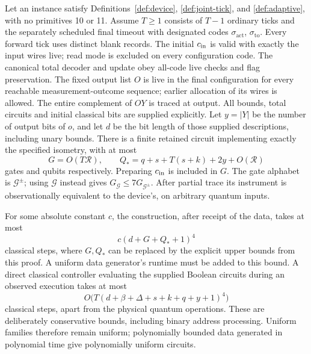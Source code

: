 \begin{theorem}
\label{eqv:forward}
Let an instance satisfy Definitions~\ref{def:device},
\ref{def:joint-tick}, and \ref{def:adaptive}, with no primitives 10 or 11.
Assume $T\geq1$ consists of $T-1$ ordinary ticks and the separately
scheduled final timeout with designated codes $\sigma_{\mathrm{act}}$,
$\sigma_{\mathrm{to}}$. Every forward tick uses distinct blank records.
The initial $c_{\rm in}$ is valid with exactly the input wires live;
read mode is excluded on every configuration code. The canonical total
decoder and update obey all-code live checks and flag preservation.
The fixed output list $O$ is live in the final configuration for every
reachable measurement-outcome sequence; earlier allocation of its wires
is allowed. The entire complement of $OY$ is traced at output.
All bounds, total circuits and initial
classical bits are supplied explicitly. Let $y=|Y|$ be the number of output bits of $o$, and let $d$ be the
bit length of those supplied descriptions, including unary bounds.
There is a finite retained circuit implementing exactly the specified
isometry, with at most
\[
 G=O(T\mathcal R),\qquad
 Q_*=q+s+T(s+k)+2y+O(\mathcal R)
\]
gates and qubits respectively. Preparing $c_{\rm in}$ is included in
$G$. The gate alphabet is $\mathcal G^{\pm}$; using $\mathcal G$ instead
gives $G_{\mathcal G}\leq7G_{\mathcal G^{\pm}}$. After partial trace its instrument is
observationally equivalent to the device's, on arbitrary quantum inputs.

For some absolute constant $c$, the construction, after receipt of the
data, takes at most
\[
 c(d+G+Q_*+1)^4
\]
classical steps, where $G,Q_*$ can be replaced by the explicit upper
bounds from this proof. A uniform data generator's runtime must be
added to this bound. A direct classical controller evaluating the
supplied Boolean circuits during an observed execution takes at most
\[
 O\bigl(T(d+\beta+\Delta+s+k+q+y+1)^4\bigr)
\]
classical steps, apart from the physical quantum operations. These are
deliberately conservative bounds, including binary address processing.
Uniform families therefore remain uniform; polynomially bounded data
generated in polynomial time give polynomially uniform circuits.
\end{theorem}
